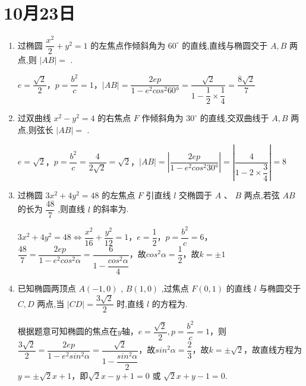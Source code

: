 \section*{10月23日}
\begin{enumerate}
    \item 过椭圆 $\dfrac{{x}^{2}}{2} + {y}^{2} = 1$ 的左焦点作倾斜角为 ${60}^{ \circ  }$ 的直线,直线与椭圆交于 $A,B$ 两点,则 $\left| {AB}\right|  =$ .
    \begin{jieda}
        $e = \dfrac{\sqrt{2}}{2}$，$p = \dfrac{b^2}{c} = 1$，$|AB| = \dfrac{2ep}{1-e^2cos^2\ang{60}} = \dfrac{\sqrt{2}}{1 - \dfrac{1}{2} \times \dfrac{1}{4}} = \dfrac{8\sqrt{2}}{7}$
    \end{jieda}
    
    \item 过双曲线 ${x}^{2} - {y}^{2} = 4$ 的右焦点 $F$ 作倾斜角为 ${30}^{ \circ  }$ 的直线,交双曲线于 $A,B$ 两点,则弦长 $\left| {AB}\right|  =$ .
    \begin{jieda}
        $e = \sqrt{2}$，$p = \dfrac{b^2}{c} = \dfrac{4}{2\sqrt{2}} = \sqrt{2}$，$|AB| = \left|\dfrac{2ep}{1-e^2cos^2\ang{30}}\right| = \left|\dfrac{4}{1-2\times \dfrac{3}{4}}\right| = 8$
    \end{jieda}
    
    \item 过椭圆 $3{x}^{2} + 4{y}^{2} = {48}$ 的左焦点 $F$ 引直线 $l$ 交椭圆于 $A$ 、 $B$ 两点,若弦 ${AB}$ 的长为 $\dfrac{48}{7}$ ,则直线 $l$ 的斜率为.
    \begin{jieda}
        $3{x}^{2} + 4{y}^{2} = {48} \Longleftrightarrow \dfrac{x^2}{16} + \dfrac{y^2}{12} = 1$，$e = \dfrac{1}{2}$，$p = \dfrac{b^2}{c} = 6$，$\dfrac{48}{7} = \dfrac{2ep}{1-e^2cos^2\alpha} = \dfrac{6}{1-\dfrac{cos^2\alpha}{4}}$，故$cos^2\alpha = \dfrac{1}{2}$，故$k = \pm 1$
    \end{jieda}
    
    \item 已知椭圆两顶点 $A\left( {-1,0}\right)$ , $B\left( {1,0}\right)$ ,过焦点 $F\left( {0,1}\right)$ 的直线 $l$ 与椭圆交于 $C,D$ 两点,当 $\left| {CD}\right|  = \dfrac{3\sqrt{2}}{2}$ 时,直线 $l$ 的方程为.
    \begin{jieda}
        根据题意可知椭圆的焦点在$y$轴，$e = \dfrac{\sqrt{2}}{2}, p = \dfrac{b^2}{c} = 1$，则$\dfrac{3\sqrt{2}}{2} = \dfrac{2ep}{1-e^2sin^2\alpha} = \dfrac{\sqrt{2}}{1-\dfrac{sin^2\alpha}{2}}$，故$sin^2\alpha = \dfrac{2}{3}$，故$k = \pm \sqrt{2}$，故直线方程为$y = \pm \sqrt{2}x + 1$，即$\sqrt{2}x - y + 1 = 0$ 或 $\sqrt{2}x + y - 1 = 0$.
    \end{jieda}
    

\end{enumerate}
